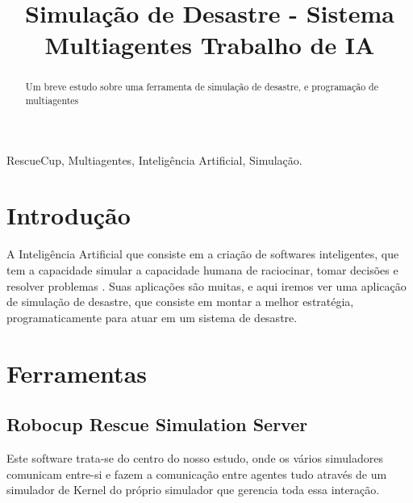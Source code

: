 \documentclass[conference]{IEEEtran}
\begin{document}
\title{Simulação de Desastre - Sistema Multiagentes  Trabalho de IA\\
}

\author{
}

\maketitle

\begin{abstract}
Um breve estudo sobre uma ferramenta de simulação de desastre, e programação de multiagentes
\end{abstract}

\begin{IEEEkeywords}
RescueCup, Multiagentes, Inteligência Artificial, Simulação.
\end{IEEEkeywords}

\section{Introdução}
A Inteligência Artificial que consiste em a criação de softwares inteligentes, que tem a capacidade simular a capacidade humana de raciocinar, tomar decisões e resolver problemas . Suas aplicações são muitas, e aqui iremos ver uma aplicação de simulação de desastre, que consiste em montar a melhor estratégia, programaticamente para atuar em um sistema de desastre.

\section{Ferramentas}

\subsection{Robocup Rescue Simulation Server}

Este software trata-se do centro do nosso estudo, onde os vários simuladores comunicam entre-si e fazem a comunicação entre agentes tudo através de um simulador de Kernel do próprio simulador que gerencia toda essa interação.
\end{document}
